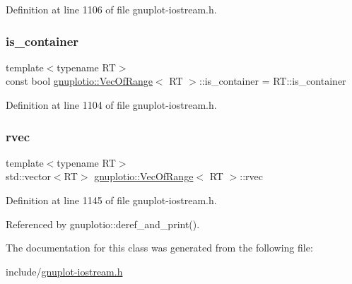 Definition at line 1106 of file gnuplot-\/iostream.\+h.

\mbox{\label{classgnuplotio_1_1_vec_of_range_a8725d4907d46575dddb7152f1f1d1f66}} 
\subsubsection{\texorpdfstring{is\+\_\+container}{is\_container}}
{\footnotesize\ttfamily template$<$typename RT$>$ \\
const bool \hyperlink{classgnuplotio_1_1_vec_of_range}{gnuplotio\+::\+Vec\+Of\+Range}$<$ RT $>$\+::is\+\_\+container = R\+T\+::is\+\_\+container\hspace{0.3cm}{\ttfamily [static]}}



Definition at line 1104 of file gnuplot-\/iostream.\+h.

\mbox{\label{classgnuplotio_1_1_vec_of_range_a44d625920b73b31599579fff8e514e7f}} 
\subsubsection{\texorpdfstring{rvec}{rvec}}
{\footnotesize\ttfamily template$<$typename RT$>$ \\
std\+::vector$<$RT$>$ \hyperlink{classgnuplotio_1_1_vec_of_range}{gnuplotio\+::\+Vec\+Of\+Range}$<$ RT $>$\+::rvec\hspace{0.3cm}{\ttfamily [private]}}



Definition at line 1145 of file gnuplot-\/iostream.\+h.



Referenced by gnuplotio\+::deref\+\_\+and\+\_\+print().



The documentation for this class was generated from the following file\+:\begin{DoxyCompactItemize}
\item 
include/\hyperlink{gnuplot-iostream_8h}{gnuplot-\/iostream.\+h}\end{DoxyCompactItemize}
